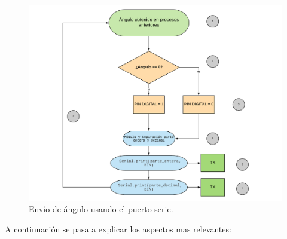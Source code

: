 \begin{figure}[H]
	\center
	\includegraphics[trim = 0mm 0mm 0mm 0mm, clip,scale=0.4]{imagenes/Balancing_robot/extraccion_angulo.pdf}
	\caption{Envío de ángulo usando el puerto serie.}
	\label{fig:extraccion_angulo}
\end{figure}

A continuación se pasa a explicar los aspectos mas relevantes: 


